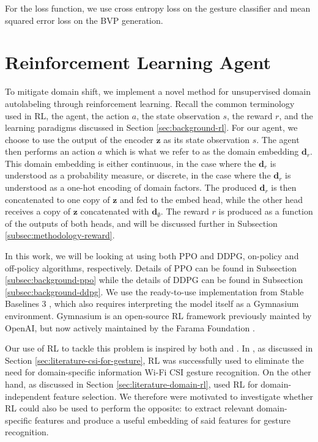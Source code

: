 For the loss function, we use cross entropy loss on the gesture classifier and mean squared error loss on the BVP generation.

\section{Reinforcement Learning Agent}\label{sec:methodology-rl}

To mitigate domain shift, we implement a novel method for unsupervised domain autolabeling through reinforcement learning.
Recall the common terminology used in RL, the agent, the action $a$, the state observation $s$, the reward $r$, and the learning paradigms discussed in Section \ref{sec:background-rl}.
For our agent, we choose to use the output of the encoder $\boldsymbol{z}$ as its state observation $s$.
The agent then performs an action $a$ which is what we refer to as the domain embedding $\boldsymbol{d}_r$.
This domain embedding is either continuous, in the case where the $\boldsymbol{d}_r$ is understood as a probability measure, or discrete, in the case where the $\boldsymbol{d}_r$ is understood as a one-hot encoding of domain factors.
The produced $\boldsymbol{d}_r$ is then concatenated to one copy of $\boldsymbol{z}$ and fed to the embed head, while the other head receives a copy of $\boldsymbol{z}$ concatenated with $\boldsymbol{d}_\emptyset$.
The reward $r$ is produced as a function of the outputs of both heads, and will be discussed further in Subsection \ref{subsec:methodology-reward}.

In this work, we will be looking at using both PPO and DDPG, on-policy and off-policy algorithms, respectively.
Details of PPO can be found in Subsection \ref{subsec:background-ppo} while the details of DDPG can be found in Subsection \ref{subsec:background-ddpg}.
We use the ready-to-use implementation from Stable Baselines 3 \cite{raffin2021stable}, which also requires interpreting the model itself as a Gymnasium environment.
Gymnasium is an open-source RL framework previously mainted by OpenAI, but now actively maintained by the Farama Foundation \cite{towers2023gymnasium}.

Our use of RL to tackle this problem is inspired by both \cite{ma2021location} and \cite{zhang2021adversarial}.
In \cite{ma2021location}, as discussed in Section \ref{sec:literature-csi-for-gesture}, RL was successfully used to eliminate the need for domain-specific information Wi-Fi CSI gesture recognition.
On the other hand, as discussed in Section \ref{sec:literature-domain-rl}, \cite{zhang2021adversarial} used RL for domain-independent feature selection.
We therefore were motivated to investigate whether RL could also be used to perform the opposite: to extract relevant domain-specific features and produce a useful embedding of said features for gesture recognition.

